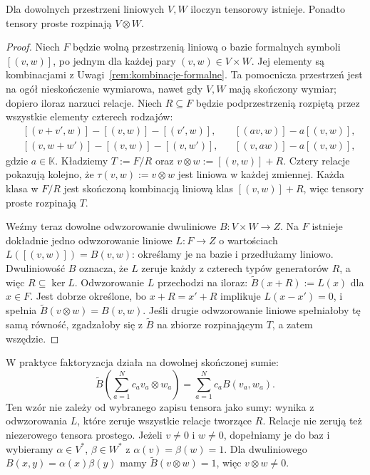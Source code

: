 \begin{twierdzenie}
\label{thm:tensor-istnienie}
Dla dowolnych przestrzeni liniowych $V,W$ iloczyn tensorowy istnieje.
Ponadto tensory proste rozpinają $V\otimes W$.
\end{twierdzenie}
\begin{proof}
Niech $F$ będzie wolną przestrzenią liniową o bazie formalnych
symboli $[(v,w)]$, po jednym dla każdej pary $(v,w)\in V\times W$.
Jej elementy są kombinacjami z Uwagi~\ref{rem:kombinacje-formalne}.
Ta pomocnicza przestrzeń jest na ogół nieskończenie wymiarowa,
nawet gdy $V,W$ mają skończony wymiar; dopiero iloraz narzuci relacje.
Niech $R\subseteq F$ będzie podprzestrzenią rozpiętą przez
wszystkie elementy czterech rodzajów:
\begin{align*}
 &[(v+v',w)]-[(v,w)]-[(v',w)],
 &&[(av,w)]-a[(v,w)],\\
 &[(v,w+w')]-[(v,w)]-[(v,w')],
 &&[(v,aw)]-a[(v,w)],
\end{align*}
gdzie $a\in\mathbb K$. Kładziemy $T:=F/R$ oraz
$v\otimes w:=[(v,w)]+R$. Cztery relacje pokazują kolejno,
że $\tau(v,w):=v\otimes w$ jest liniowa w każdej zmiennej.
Każda klasa w $F/R$ jest skończoną kombinacją liniową klas $[(v,w)]+R$,
więc tensory proste rozpinają $T$.

Weźmy teraz dowolne odwzorowanie dwuliniowe $B\colon V\times W\to Z$.
Na $F$ istnieje dokładnie jedno odwzorowanie liniowe
$L\colon F\to Z$ o wartościach $L([(v,w)])=B(v,w)$:
określamy je na bazie i przedłużamy liniowo. Dwuliniowość $B$
oznacza, że $L$ zeruje każdy z czterech typów generatorów $R$,
a więc $R\subseteq\ker L$. Odwzorowanie $L$ przechodzi na iloraz:
$\widetilde B(x+R):=L(x)$ dla $x\in F$. Jest dobrze określone, bo
$x+R=x'+R$ implikuje $L(x-x')=0$, i spełnia
$\widetilde B(v\otimes w)=B(v,w)$. Jeśli drugie odwzorowanie liniowe
spełniałoby tę samą równość, zgadzałoby się z $\widetilde B$
na zbiorze rozpinającym $T$, a zatem wszędzie.
\end{proof}

W praktyce faktoryzacja działa na dowolnej skończonej sumie:
\[
 \widetilde B\!\left(\sum_{a=1}^N c_a v_a\otimes w_a\right)
   =\sum_{a=1}^N c_a B(v_a,w_a).
\]
Ten wzór nie zależy od wybranego zapisu tensora jako sumy:
wynika z odwzorowania $L$, które zeruje wszystkie relacje tworzące $R$.
Relacje nie zerują też niezerowego tensora prostego. Jeżeli
$v\ne0$ i $w\ne0$, dopełniamy je do baz i wybieramy
$\alpha\in V^*$, $\beta\in W^*$ z
$\alpha(v)=\beta(w)=1$. Dla dwuliniowego
$B(x,y)=\alpha(x)\beta(y)$ mamy
$\widetilde B(v\otimes w)=1$, więc $v\otimes w\ne0$.

